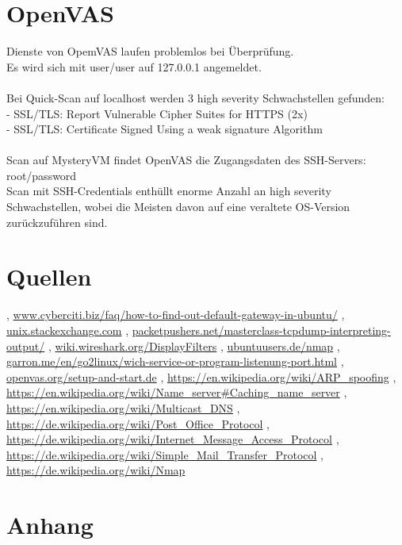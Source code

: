 \documentclass[12pt]{article}
\theoremstyle{plain}
\begin{document}
\section{OpenVAS}
Dienste von OpemVAS laufen problemlos bei Überprüfung. \\
Es wird sich mit user/user auf 127.0.0.1 angemeldet. \\ \\
Bei Quick-Scan auf localhost werden 3 high severity Schwachstellen gefunden:\\
- SSL/TLS: Report Vulnerable Cipher Suites for HTTPS (2x)\\
- SSL/TLS: Certificate Signed Using a weak signature Algorithm\\\\
Scan auf MysteryVM findet OpenVAS die Zugangsdaten des SSH-Servers: root/password\\
Scan mit SSH-Credentials enthüllt enorme Anzahl an high severity Schwachstellen, wobei die Meisten davon auf eine veraltete OS-Version zurückzuführen sind.
\newline
\section{Quellen}
\begin{thebibliography}{50}
\bibitem  [Cyberciti], \url{www.cyberciti.biz/faq/how-to-find-out-default-gateway-in-ubuntu/}
\bibitem [Stackexchange] , \url{unix.stackexchange.com}
\bibitem [Tcpdump], \url{packetpushers.net/masterclass-tcpdump-interpreting-output/}
\bibitem [Wireshark], \url{wiki.wireshark.org/DisplayFilters}
\bibitem [Nmap 1], \url{ubuntuusers.de/nmap}
\bibitem [Nmap 2], \url{garron.me/en/go2linux/wich-service-or-program-listenung-port.html}
\bibitem [OpenVAS], \url{openvas.org/setup-and-start.de}
, \url{https://en.wikipedia.org/wiki/ARP_spoofing}
\bibitem [DNS], \url{https://en.wikipedia.org/wiki/Name_server#Caching_name_server}
\bibitem [DNS 2], \url{https://en.wikipedia.org/wiki/Multicast_DNS}
\bibitem [POP], \url{https://de.wikipedia.org/wiki/Post_Office_Protocol}
\bibitem [IMAP], \url{https://de.wikipedia.org/wiki/Internet_Message_Access_Protocol}
\bibitem [SMTP], \url{https://de.wikipedia.org/wiki/Simple_Mail_Transfer_Protocol}
\bibitem [Nmap 3], \url{https://de.wikipedia.org/wiki/Nmap}	
\end{thebibliography}
\section{Anhang}
\end{document}
